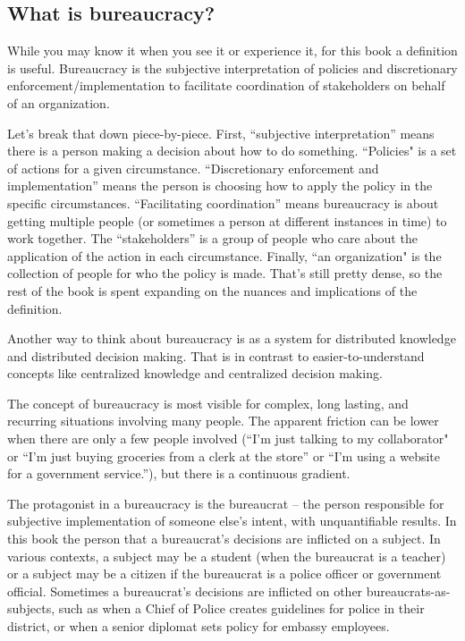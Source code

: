 \subsection{What is bureaucracy?}
While you may know it when you see it or experience it, for this book a definition is useful. 
\gls{Bureaucracy} is the subjective interpretation of policies and discretionary enforcement/implementation to facilitate coordination of stakeholders on behalf of an organization. 

Let's break that down piece-by-piece. First, ``subjective interpretation'' means there is a person making a decision about how to do something. ``Policies" is a set of actions for a given circumstance. ``Discretionary enforcement and implementation'' means the person is choosing how to apply the policy in the specific circumstances.  ``Facilitating coordination'' means bureaucracy is about getting multiple people (or sometimes a person at different instances in time) to work together. The ``stakeholders'' is a group of people who care about the application of the action in each circumstance. Finally, ``an \gls{organization}" is the collection of people for who the policy is made. That's still pretty dense, so the rest of the book is spent expanding on the nuances and implications of the definition.


Another way to think about bureaucracy is as a system for distributed knowledge and distributed decision making. That is in contrast to easier-to-understand concepts like centralized knowledge and centralized decision making. 

The concept of bureaucracy is most visible for complex, long lasting, and recurring situations involving many people. The apparent friction can be lower when there are only a few people involved (``I'm just talking to my collaborator" or ``I'm just buying groceries from a clerk at the store'' or ``I'm using a website for a government service.''), but there is a continuous gradient. 


The protagonist in a bureaucracy is the \gls{bureaucrat} -- the person responsible for subjective implementation of someone else's intent, with unquantifiable results. In this book the person that a bureaucrat's decisions are inflicted on a \gls{subject}. In various contexts, a subject may be a student (when the bureaucrat is a teacher) or a subject may be a citizen if the bureaucrat is a police officer or government official. Sometimes a bureaucrat's decisions are inflicted on other bureaucrats-as-subjects, such as when a Chief of Police creates guidelines for police in their district, or when a senior diplomat sets policy for embassy employees. 

